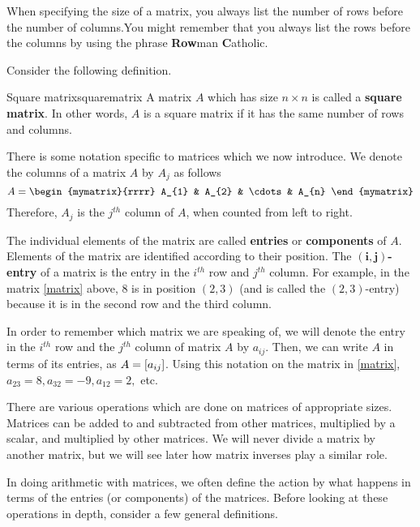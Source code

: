 When specifying the size of a matrix, you always list the number
of rows before the number of columns.You
might remember that you always list the rows before the columns by using the
phrase \textbf{Row}man \textbf{C}atholic. 

Consider the following definition.

\begin{definition}{Square matrix}{squarematrix}
A matrix $A$ which has size $n \times n$ is called a \textbf{square matrix}.
In other words, $A$ is a square matrix if it has the same number of rows
and columns.
\end{definition}

There is some notation specific to matrices which we now introduce. We denote the columns of a matrix $A$ 
by $A_{j}$ as follows
\begin{equation*}
A = 
\begin{mymatrix}{rrrr}
A_{1} & A_{2} & \cdots & A_{n}
\end{mymatrix}
\end{equation*}
Therefore, $A_{j}$ is the $j^{th}$ column of $A$, when counted from left to right. 

The individual elements of the matrix are called \textbf{entries} or \textbf{components} of $A$. Elements of the matrix
are identified according to their position. The $\mathbf{\left( i, j \right)}$\textbf{-entry} of a matrix is the entry 
in the $i^{th}$ row and $j^{th}$ column. For example, in the matrix \ref{matrix} above,  $8$ is in
position $\left(2,3 \right)$ (and is called the $\left(2,3 \right)$-entry) because it is in the second row and the third column. 

In order to remember which matrix we are speaking of, we 
will denote the entry in the $i^{th}$ row  and the $j^{th}$ column of matrix $A$ by $a_{ij}$. Then, we can write $A$ in terms of its entries,
as $A= \left[ a_{ij} \right]$. Using this notation on the matrix in \ref{matrix},
$a_{23}=8, a_{32}=-9, a_{12}=2,$ etc.

There are various operations which are done on matrices of appropriate
sizes. Matrices can be added to and subtracted from other matrices,
multiplied by a scalar, and multiplied by other matrices. We will
never divide a matrix by another matrix, but we will see later how matrix inverses play a similar role. 

In doing arithmetic with matrices, we often define the action by what
happens in terms of the entries (or components) of the
matrices. Before looking at these operations in depth, consider a few
general definitions.

